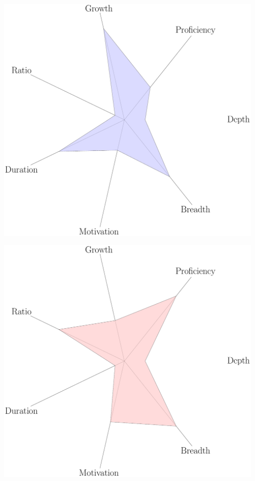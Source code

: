 \documentclass{beamer}
\begin{document}
    \begin{frame}
        \begin{columns}
            \begin{column}{.5\textwidth}
                \centering
                \includegraphics[height=.45\textheight]{static/big-class/main.pdf}

                \includegraphics[height=.45\textheight]{static/rsd/main.pdf}
            \end{column}


\end{columns}
\end{frame}
\end{document}
